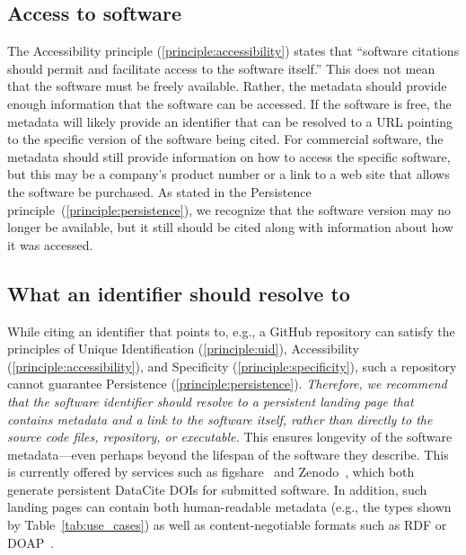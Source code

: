 \documentclass[12pt, oneside]{amsart}
\newcommand{\LJHnote}[1]{ {\textcolor{fuschsia} { ***LJH: #1 }}} %
\begin{document}
\subsection{Access to software}
\label{sec:access}

The Accessibility principle (\ref{principle:accessibility}) states that ``software citations should permit and facilitate access to the software itself.''
This does not mean that the software must be freely available.
Rather, the metadata should provide enough information that the software can be accessed.
If the software is free, the metadata will likely provide an identifier that can be resolved to a URL pointing to the specific version of the software being cited.
For commercial software, the metadata should still provide information on how to access the specific software, but this may be a company's product number or a link to a web site that allows the software be purchased.
As stated in the Persistence principle~(\ref{principle:persistence}), we recognize that the software version may no longer be available, but it still should be cited along with information about how it was accessed.

\subsection{What an identifier should resolve to}

While citing an identifier that points to, e.g., a GitHub repository can satisfy the principles of Unique Identification (\ref{principle:uid}), Accessibility (\ref{principle:accessibility}), and Specificity (\ref{principle:specificity}), such a repository cannot guarantee Persistence (\ref{principle:persistence}).
\textit{Therefore, we recommend that the software identifier should resolve to a persistent landing page that contains metadata and a link to the software itself, rather than directly to the source code files, repository, or executable.}
This ensures longevity of the software metadata---even perhaps beyond the lifespan of the software they describe.
This is currently offered by services such as figshare~\cite{figshare} and Zenodo~\cite{github-citable-code-guide}, which both generate persistent DataCite DOIs for submitted software.
In addition, such landing pages can contain both human-readable metadata (e.g., the types shown by Table~\ref{tab:use_cases}) as well as content-negotiable formats such as RDF or DOAP~\cite{DOAP}.

\end{document}
